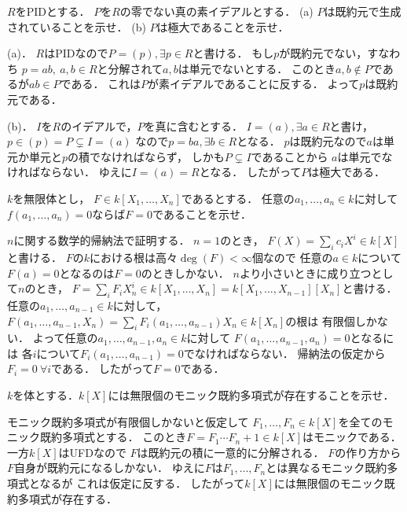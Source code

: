 \begin{prob}
  $R$をPIDとする．
  $P$を$R$の零でない真の素イデアルとする．
  (a) $P$は既約元で生成されていることを示せ．
  (b) $P$は極大であることを示せ．
\end{prob}
\begin{ans}
  (a)．
  $R$はPIDなので$P = (p), \exists p \in R$と書ける．
  もし$p$が既約元でない，すなわち
  $p = ab, \ a,b\in R$と分解されて$a,b$は単元でないとする．
  このとき$a,b \not\in P$であるが$ab \in P$である．
  これは$P$が素イデアルであることに反する．
  よって$p$は既約元である．

  (b)．
  $I$を$R$のイデアルで，$P$を真に含むとする．
  $I = (a), \exists a\in R$と書け，
  $p \in (p) = P \subsetneq I = (a)$
  なので$p = ba, \exists b \in R$となる．
  $p$は既約元なので$a$は単元か単元と$p$の積でなければならず，
  しかも$P \subsetneq I$であることから
  $a$は単元でなければならない．
  ゆえに$I = (a) = R$となる．
  したがって$P$は極大である．
\end{ans}

\begin{prob}\label{全ての点に対して0なら零多項式}
  $k$を無限体とし，
  $F \in k[X_1, \dots ,X_n]$であるとする．
  任意の$a_1,\dots ,a_n \in k$に対して
  $f(a_1,\dots,a_n) = 0$ならば$F = 0$であることを示せ．
\end{prob}
\begin{ans}
  $n$に関する数学的帰納法で証明する．
  $n=1$のとき，
  $F(X) = \sum_i c_i X^i \in k[X]$と書ける．
  $F$の$k$における根は高々$\deg(F) < \infty$個なので
  任意の$a \in k$について$F(a) = 0$となるのは$F = 0$のときしかない．
  $n$より小さいときに成り立つとして$n$のとき，
  $ F = \sum_i F_i X_n^i \in k[X_1,\dots ,X_n] = k[X_1,\dots,X_{n-1}][X_n]$と書ける．
  任意の$a_1,\dots,a_{n-1} \in k$に対して，
  $F(a_1, \dots, a_{n-1}, X_n) = \sum_i F_i(a_1,\dots,a_{n-1}) X_n \in k[X_n]$の根は
  有限個しかない．
  よって任意の$a_1,\dots, a_{n-1}, a_n \in k$に対して
  $F(a_1, \dots, a_{n-1}, a_n) = 0$となるには
  各$i$について$F_i (a_1, \dots, a_{n-1}) = 0$でなければならない．
  帰納法の仮定から$F_i = 0 \ \forall i$である．
  したがって$F = 0$である．
\end{ans}

\begin{prob}\label{無限個のモニック既約多項式}
  $k$を体とする．$k[X]$には無限個のモニック既約多項式が存在することを示せ．
\end{prob}
\begin{ans}
  モニック既約多項式が有限個しかないと仮定して
  $F_1,\dots,F_n \in k[X]$を全てのモニック既約多項式とする．
  このとき$F = F_1 \cdots F_n + 1 \in k[X]$はモニックである．
  一方$k[X]$はUFDなので
  $F$は既約元の積に一意的に分解される．
  $F$の作り方から$F$自身が既約元になるしかない．
  ゆえに$F$は$F_1,\dots,F_n$とは異なるモニック既約多項式となるが
  これは仮定に反する．
  したがって$k[X]$には無限個のモニック既約多項式が存在する．
\end{ans}

